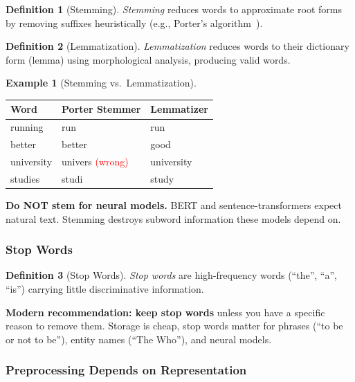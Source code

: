 \documentclass[11pt,a4paper]{article}
\theoremstyle{definition}
\newtheorem{definition}{Definition}[section]
\newtheorem{example}{Example}[section]
\theoremstyle{plain}
\begin{document}
\begin{definition}[Stemming]
\emph{Stemming} reduces words to approximate root forms by removing suffixes heuristically (e.g., Porter's algorithm~\cite{porter1980algorithm}).
\end{definition}

\begin{definition}[Lemmatization]
\emph{Lemmatization} reduces words to their dictionary form (lemma) using morphological analysis, producing valid words.
\end{definition}

\begin{example}[Stemming vs.\ Lemmatization]
\begin{center}
\begin{tabular}{lll}
\toprule
\textbf{Word} & \textbf{Porter Stemmer} & \textbf{Lemmatizer} \\
\midrule
running & run & run \\
better & better & good \\
university & univers \textcolor{red}{(wrong)} & university \\
studies & studi & study \\
\bottomrule
\end{tabular}
\end{center}
\end{example}

\begin{pitfall}
\textbf{Do NOT stem for neural models.} BERT and sentence-transformers expect natural text. Stemming destroys subword information these models depend on.
\end{pitfall}

\subsubsection{Stop Words}

\begin{definition}[Stop Words]
\emph{Stop words} are high-frequency words (``the'', ``a'', ``is'') carrying little discriminative information.
\end{definition}

\textbf{Modern recommendation: keep stop words} unless you have a specific reason to remove them. Storage is cheap, stop words matter for phrases (``to be or not to be''), entity names (``The Who''), and neural models.

\subsubsection{Preprocessing Depends on Representation}
\end{document}
